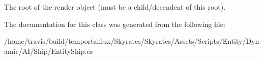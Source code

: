 The root of the render object (must be a child/decendent of this root). 



The documentation for this class was generated from the following file\-:\begin{DoxyCompactItemize}
\item 
/home/travis/build/temportalflux/\-Skyrates/\-Skyrates/\-Assets/\-Scripts/\-Entity/\-Dynamic/\-A\-I/\-Ship/Entity\-Ship.\-cs\end{DoxyCompactItemize}
